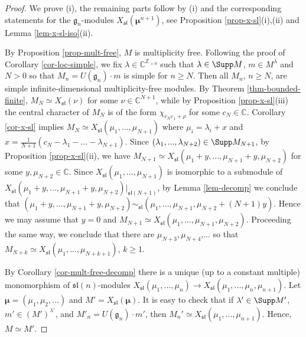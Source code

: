 \documentclass[12pt]{amsart}
\newcommand{\C}{{\mathbb C}}
\newcommand{\Z}{{\mathbb Z}}
\def\gg{\mathfrak{g}}
\def\Z{\mathbb{Z}}
\begin{document}
\begin{proof}
 We prove (i), the remaining parts follow by (i) and the corresponding statements for the $\gg_n$-modules $X_{\mathfrak{sl}}(\boldsymbol{\mu}^{n+1})$, see Proposition \ref{prop-x-sl}(i),(ii) and Lemma \ref{lem-x-sl-iso}(ii). 

 By Proposition \ref{prop-mult-free}, $M$ is multiplicity free.  Following the proof of Corollary \ref{cor-loc-simple}, we fix $\lambda \in \C^{\Z_{>0}}$ such that  $\lambda \in \Supp M$, $m \in M^{\lambda}$ and $N>0$ so that $M_n = U(\gg_n) \cdot m$ is simple for $n \geq N$. Then all $M_n$, $n \geq N$, are simple infinite-dimensional multiplicity-free modules.  By Theorem \ref{thm-bounded-finite}, $M_N \simeq X_{\mathfrak{sl}}(\nu)$ for some $\nu \in \C^{N+1}$, while  by Proposition \ref{prop-x-sl}(iii) the central character of  $M_N$ is of the form $\chi_{c_N \varepsilon_1 + \rho}$ for some $c_N \in \C$. Corollary \ref{cor-x-sl} implies $M_N \simeq  X_{\mathfrak{sl}} (\mu_1,...,\mu_{N+1})$ where $\mu_i = \lambda_i + x$ and $x = \frac{1}{N+1} \left( c_N - \lambda_1-...- \lambda_{N+1}\right)$. Since $(\lambda_1,...,\lambda_{N+2}) \in \Supp M_{N+1}$, by Proposition \ref{prop-x-sl}(ii), we have  $M_{N+1} \simeq  X_{\mathfrak{sl}} (\mu_1+y,...,\mu_{N+1}+y,\mu_{N+2})$ for some $y,\mu_{N+2} \in \C$. Since $X_{\mathfrak{sl}} (\mu_1,...,\mu_{N+1})$ is isomorphic to a submodule of $X_{\mathfrak{sl}} (\mu_1+y,...,\mu_{N+1}+y,\mu_{N+2}) |_{\mathfrak{sl}(N+1)}$, by Lemma \ref{lem-decomp} we conclude that 
$(\mu_1+y,...,\mu_{N+1}+y,\mu_{N+2}) \sim_{\mathfrak{sl}} (\mu_1,...,\mu_{N+1},\mu_{N+2} + (N+1)y)$. Hence we may assume that $y = 0$ and $M_{N+1} \simeq  X_{\mathfrak{sl}} (\mu_1,...,\mu_{N+1}, \mu_{N+2})$. Proceeding the same way, we conclude that there are $\mu_{N+3}, \mu_{N+4}$,... so that $M_{N+k} \simeq  X_{\mathfrak{sl}} (\mu_1,..., \mu_{N+k+1})$, $k \geq 1$.

 By Corollary \ref{cor-mult-free-decomp} there is a unique (up to a constant multiple) monomorphism of $\mathfrak{sl} (n)$-modules $X_{\mathfrak{sl}}(\mu_1,...,\mu_n) \to X_{\mathfrak{sl}}(\mu_1,...,\mu_n, \mu_{n+1})$. Let $\boldsymbol{\mu} = (\mu_1,\mu_2,...)$ and $M' = X_{\mathfrak{sl}}(\boldsymbol{\mu})$. It is easy to check that if $\lambda' \in \Supp M'$, $m' \in (M')^{\lambda'}$, and $M'_n = U(\gg_n)\cdot m'$, then $M_n' \simeq X_{\mathfrak{sl}} (\mu_1,...,\mu_{n+1})$. Hence, $M \simeq M'$.\end{proof}
\end{document}
